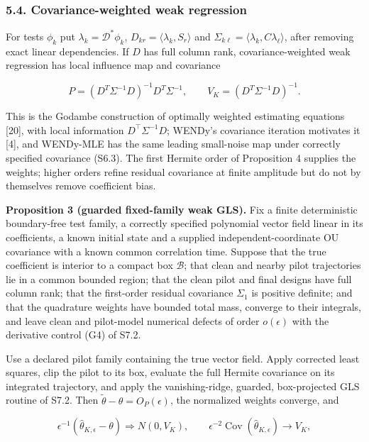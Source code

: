 \documentclass[
  american,
  11pt,
]{article}
\begin{document}
\subsubsection{5.4. Covariance-weighted weak
regression}\label{covariance-weighted-weak-regression}

For tests \(\phi_k\) put \(\lambda_k=\mathcal D^*\phi_k\),
\(D_{kr}=\langle\lambda_k,S_r\rangle\) and
\(\Sigma_{k\ell}=\langle\lambda_k,C\lambda_\ell\rangle\), after removing
exact linear dependencies. If \(D\) has full column rank,
covariance-weighted weak regression has local influence map and
covariance

\[
P=(D^T\Sigma^{-1}D)^{-1}D^T\Sigma^{-1},\qquad
V_K=(D^T\Sigma^{-1}D)^{-1}.
\]

This is the Godambe construction of optimally weighted estimating
equations {[}20{]}, with local information \(D^\top\Sigma^{-1}D\);
WENDy's covariance iteration motivates it {[}4{]}, and WENDy-MLE has the
same leading small-noise map under correctly specified covariance
(S6.3). The first Hermite order of Proposition 4 supplies the weights;
higher orders refine residual covariance at finite amplitude but do not
by themselves remove coefficient bias.

\textbf{Proposition 3 (guarded fixed-family weak GLS).} Fix a finite
deterministic boundary-free test family, a correctly specified
polynomial vector field linear in its coefficients, a known initial
state and a supplied independent-coordinate OU covariance with a known
common correlation time. Suppose that the true coefficient is interior
to a compact box \(\mathcal B\); that clean and nearby pilot
trajectories lie in a common bounded region; that the clean pilot and
final designs have full column rank; that the first-order residual
covariance \(\Sigma_1\) is positive definite; and that the quadrature
weights have bounded total mass, converge to their integrals, and leave
clean and pilot-model numerical defects of order \(o(\epsilon)\) with
the derivative control (G4) of S7.2.

Use a declared pilot family containing the true vector field. Apply
corrected least squares, clip the pilot to its box, evaluate the full
Hermite covariance on its integrated trajectory, and apply the
vanishing-ridge, guarded, box-projected GLS routine of S7.2. Then
\(\widetilde\theta-\theta=O_P(\epsilon)\), the normalized weights
converge, and

\[
\epsilon^{-1}(\widehat\theta_{K,\epsilon}-\theta)\Rightarrow N(0,V_K),\qquad
\epsilon^{-2}\operatorname{Cov}(\widehat\theta_{K,\epsilon})\to V_K,
\]
\end{document}
